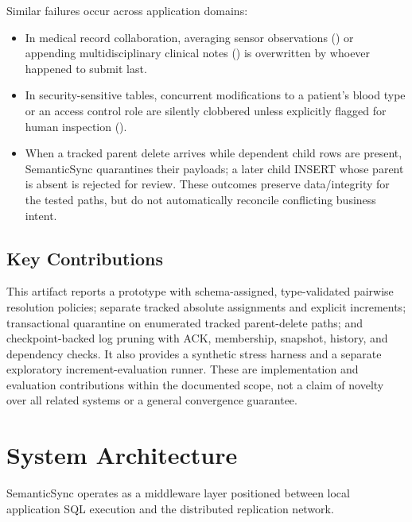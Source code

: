 \documentclass[runningheads]{llncs}
\begin{document}
Similar failures occur across application domains:

\begin{itemize}
\item In medical record collaboration, averaging sensor observations (\texttt{}) or appending multidisciplinary clinical notes (\texttt{}) is overwritten by whoever happened to submit last.
\item In security-sensitive tables, concurrent modifications to a patient's blood type or an access control role are silently clobbered unless explicitly flagged for human inspection (\texttt{}).
\item When a tracked parent delete arrives while dependent child rows are present, SemanticSync quarantines their payloads; a later child INSERT whose parent is absent is rejected for review. These outcomes preserve data/integrity for the tested paths, but do not automatically reconcile conflicting business intent.
\end{itemize}
\subsection{Key Contributions}
This artifact reports a prototype with schema-assigned, type-validated pairwise resolution policies; separate tracked absolute assignments and explicit increments; transactional quarantine on enumerated tracked parent-delete paths; and checkpoint-backed log pruning with ACK, membership, snapshot, history, and dependency checks. It also provides a synthetic stress harness and a separate exploratory increment-evaluation runner. These are implementation and evaluation contributions within the documented scope, not a claim of novelty over all related systems or a general convergence guarantee.

\section{System Architecture}
SemanticSync operates as a middleware layer positioned between local application SQL execution and the distributed replication network.
\end{document}
